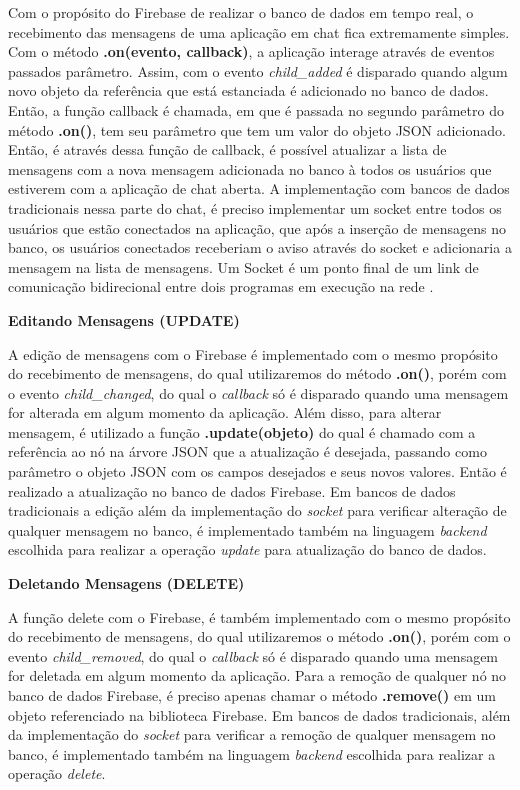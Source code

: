 \documentclass[12pt]{article}
\begin{document}
Com o propósito do Firebase de realizar o banco de dados em tempo real, o recebimento das mensagens de uma aplicação em chat fica extremamente simples. Com o método \textbf{.on(evento, callback)}, a aplicação interage através de eventos passados parâmetro. Assim, com o evento \textit{child\_added} é disparado quando algum novo objeto da referência que está estanciada é adicionado no banco de dados. Então, a função callback é chamada, em que é passada no segundo parâmetro do método \textbf{.on()}, tem seu parâmetro que tem um valor do objeto JSON adicionado. Então, é através dessa função de callback, é possível atualizar a lista de mensagens com a nova mensagem adicionada no banco à todos os usuários que estiverem com a aplicação de chat aberta. A implementação com bancos de dados tradicionais nessa parte do chat, é preciso implementar um socket entre todos os usuários que estão conectados na aplicação, que após a inserção de mensagens no banco, os usuários conectados receberiam o aviso através do socket e adicionaria a mensagem na lista de mensagens. Um Socket é um ponto final de um link de comunicação bidirecional entre dois programas em execução na rede \cite{socket}.

\textbf{Editando Mensagens (UPDATE)}

A edição de mensagens com o Firebase é implementado com o mesmo propósito do recebimento de mensagens, do qual utilizaremos do método \textbf{.on()}, porém com o evento \textit{child\_changed}, do qual o \textit{callback} só é disparado quando uma mensagem for alterada em algum momento da aplicação. Além disso, para alterar mensagem, é utilizado a função \textbf{.update(objeto)} do qual é chamado com a referência ao nó na árvore JSON que a atualização é desejada, passando como parâmetro o objeto JSON com os campos desejados e seus novos valores. Então é realizado a atualização no banco de dados Firebase. Em bancos de dados tradicionais a edição além da implementação do \textit{socket} para verificar alteração de qualquer mensagem no banco, é implementado também na linguagem \textit{backend} escolhida para realizar a operação \textit{update} para atualização do banco de dados.

\textbf{Deletando Mensagens (DELETE)}

A função delete com o Firebase, é também implementado com o mesmo propósito do recebimento de mensagens, do qual utilizaremos o método \textbf{.on()}, porém com o evento \textit{child\_removed}, do qual o \textit{callback} só é disparado quando uma mensagem for deletada em algum momento da aplicação. Para a remoção de qualquer nó no banco de dados Firebase, é preciso apenas chamar o método \textbf{.remove()} em um objeto referenciado na biblioteca Firebase. Em bancos de dados tradicionais, além da implementação do \textit{socket} para verificar a remoção de qualquer mensagem no banco, é implementado também na linguagem \textit{backend} escolhida para realizar a operação \textit{delete}.
\end{document}
